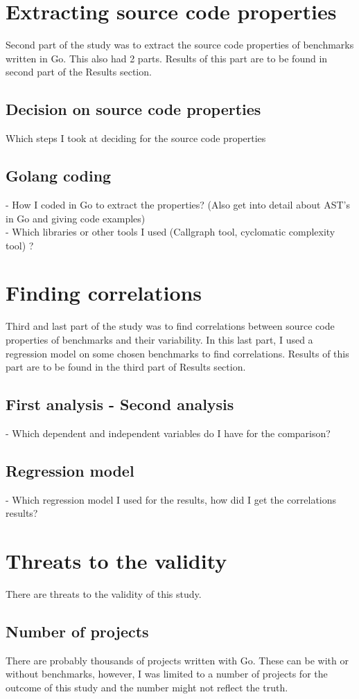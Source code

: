 \documentclass{seal_thesis}
\begin{document}
\section{Extracting source code properties}
Second part of the study was to extract the source code properties of benchmarks written in Go. This also had 2 parts. Results of this part are to be found in second part of the Results section.

\subsection{Decision on source code properties}
Which steps I took at deciding for the source code properties

\subsection{Golang coding}
- How I coded in Go to extract the properties? (Also get into detail about AST's in Go and giving code examples) \\
- Which libraries or other tools I used (Callgraph tool, cyclomatic complexity tool) ? \\

\section{Finding correlations}
Third and last part of the study was to find correlations between source code properties of benchmarks and their variability. In this last part, I used a regression model on some chosen benchmarks to find correlations. Results of this part are to be found in the third part of Results section.
\subsection{First analysis - Second analysis}
- Which dependent and independent variables do I have for the comparison?
\subsection{Regression model}
- Which regression model I used for the results, how did I get the correlations results?

\section{Threats to the validity}
There are threats to the validity of this study.
\subsection{Number of projects}
There are probably thousands of projects written with Go. These can be with or without benchmarks, however, I was limited to a number of projects for the outcome of this study and the number might not reflect the truth.
\end{document}
